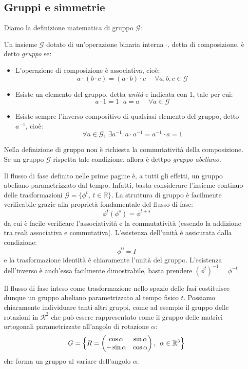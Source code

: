 \documentclass[a4paper,openany]{article}
\begin{document}
	\subsection{Gruppi e simmetrie}
	Diamo la definizione matematica di gruppo $\mathcal{G}$:
	\begin{tcolorbox}
		Un insieme $\mathcal{G}$ dotato di un'operazione binaria interna $\cdot$, detta di composizione, è detto \textit{gruppo} se:
		\begin{itemize}
			\item L'operazione di composizione è associativa, cioè:
			$$
			a\cdot(b\cdot c) = (a\cdot b)\cdot c \>\>\>\>\>\> \forall a,b,c \in \mathcal{G}
			$$
			\item Esiste un elemento del gruppo, detta \textit{unità} e indicata con $1$, tale per cui:
			$$
			a\cdot 1 = 1\cdot a = a \>\>\>\>\>\> \forall a \in \mathcal{G}
			$$
			\item Esiste sempre l'inverso compositivo di qualsiasi elemento del gruppo, detto $a^{-1}$, cioè:
			$$
			\forall a \in \mathcal{G}, \> \exists a^{-1} : a\cdot a^{-1} = a^{-1}\cdot a = 1
			$$
		\end{itemize}
	\end{tcolorbox}
	Nella definizione di gruppo non è richiesta la commutatività della composizione. Se un gruppo $\mathcal{G}$ rispetta tale condizione, allora è dettpo \textit{gruppo abeliano}.
	
	Il flusso di fase definito nelle prime pagine è, a tutti gli effetti, un gruppo abeliano parametrizzato dal tempo. Infatti, basta considerare l'insieme continuo delle trasformazioni $\mathcal{G} = \{\phi^{t}, \> t\in \mathbb{R}\}$. La struttura di gruppo è facilmente verificabile grazie alla proprietà fondamentale del flusso di fase:
	$$
	\phi^{t}(\phi^{s}) = \phi^{t+s}
	$$
	da cui è facile verificare l'associatività e la commutatività (essendo la addizione tra reali associativa e commutativa). L'esistenza dell'unità è assicurata dalla condizione:
	$$
	\phi^{0} = I
	$$
	e la trasformazione identità è chiaramente l'unità del gruppo. L'esistenza dell'inverso è anch'essa facilmente dimostrabile, basta prendere $(\phi^{t})^{-1} = \phi^{-t}$.
	
	Il flusso di fase inteso come trasformazione nello spazio delle fasi costituisce dunque un gruppo abeliano parametrizzato al tempo fisico $t$. Possiamo chiaramente individuare tanti altri gruppi, come ad esempio il gruppo delle rotazioni in $\mathcal{R}^{2}$ che può essere rappresentato come il gruppo delle matrici ortogonali parametrizzate all'angolo di rotazione $\alpha$:
	\begin{equation}
		G = \Bigl\{
		R = 
		\begin{pmatrix}
			\cos\alpha & \sin\alpha \\
			-\sin\alpha & \cos\alpha
		\end{pmatrix}
		,\>\> \alpha \in \mathbb{R}^{3}
		\Bigl\}
	\end{equation}
	che forma un gruppo al variare dell'angolo $\alpha$.
	
\end{document}
